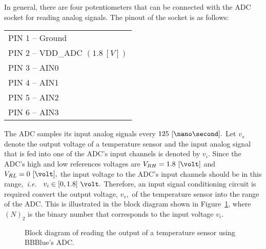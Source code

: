 In general, there are four potentiometers that can be connected with the ADC socket for reading analog signals. The pinout of the socket is as follows: %
%
\begin{center}
  \begin{tabular}{l}
    PIN 1 -- Ground\\
    PIN 2 -- VDD\_ADC $(1.8~[V])$\\
    PIN 3 -- AIN0\\
    PIN 4 -- AIN1\\
    PIN 5 -- AIN2\\
    PIN 6 -- AIN3  
  \end{tabular}
\end{center}
%
The ADC samples its input analog signals every $125~[\nano\second].$ Let $v_s$ denote the output voltage  of a temperature sensor and the input analog signal that is fed into one of  the ADC's input channels is denoted by $v_i.$  Since the ADC's high and low references voltages are $V_{RH} = 1.8~[\volt]$ and $V_{RL} = 0~[\volt],$ the input voltage to the ADC's input channels should be in this range,~\textit{i.e.~} $v_i\in[0,1.8]~\volt.$ Therefore, an input  signal conditioning circuit is required convert the output voltage, $v_s,$ of the temperature sensor into the range of the ADC. This is illustrated in the block diagram shown in  Figure~\ref{fig:BBBlue-ADC-BD}, where $(N)_2$ is the binary number that corresponds to the input voltage $v_i.$ %
%
\begin{figure}
  \centering
  \caption{Block diagram of reading the output of a temperature sensor using BBBlue's ADC.}
  \label{fig:BBBlue-ADC-BD}
\end{figure}
